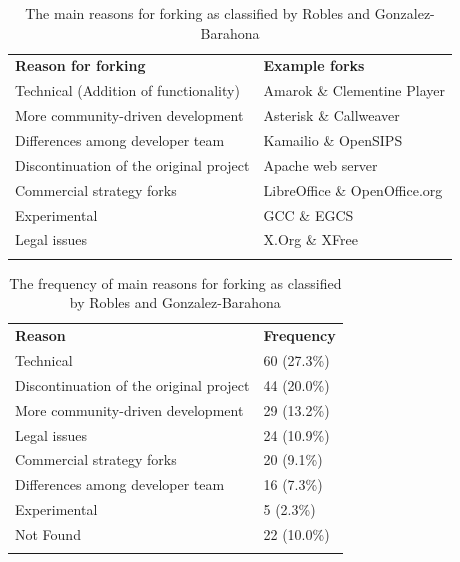 \documentclass[12pt]{report}
\begin{document}
\begin{table}[!ht]
\centering
\caption[The main reasons for forking]{The main reasons for forking as classified by Robles and Gonzalez-Barahona \cite{Robles}}
\label{tableReasonsForForking}
\begin{tabular}{p{} p{}}
\hline\noalign{\smallskip}
\textbf{Reason for forking} & \textbf{Example forks} \\
\noalign{\smallskip}\hline\noalign{\smallskip}
Technical (Addition of functionality) & Amarok \& Clementine Player \\ \hline
More community-driven development & Asterisk \& Callweaver \\ \hline
Differences among developer team & Kamailio \& OpenSIPS \\ \hline
Discontinuation of the original project & Apache web server \\ \hline
Commercial strategy forks & LibreOffice \& OpenOffice.org \\ \hline
Experimental & GCC \& EGCS \\ \hline
Legal issues & X.Org \& XFree\\
\noalign{\smallskip}\hline
\end{tabular}
\end{table}

\begin{table}[!ht]
\centering
\caption[The frequency of main reasons for forking]{The frequency of main reasons for forking as classified by Robles and Gonzalez-Barahona \cite{Robles}}
\label{tableReasonsForForkingFrequency}
\begin{tabular}{p{} p{}}
\hline\noalign{\smallskip}
\textbf{Reason} & \textbf{Frequency} \\
\noalign{\smallskip}\hline\noalign{\smallskip}
Technical & 60 (27.3\%)\\ \hline
Discontinuation of the original project & 44 (20.0\%)  \\ \hline
More community-driven development & 29 (13.2\%) \\ \hline
Legal issues &  24 (10.9\%) \\ \hline
Commercial strategy forks &  20 (9.1\%)  \\ \hline
Differences among developer team &  16 (7.3\%)  \\ \hline
Experimental &  5  (2.3\%) \\ \hline
Not Found &  22 (10.0\%) \\ 
\noalign{\smallskip}\hline
\end{tabular}
\end{table}
\end{document}
